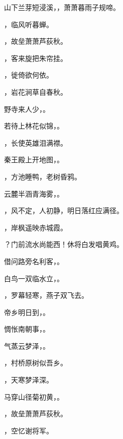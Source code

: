 \documentclass[12pt, a4paper, addpoints]{exam}
\begin{document}
\begin{questions}
\question[1] 山下兰芽短浸溪，\uline{\qquad\qquad\qquad}，萧萧暮雨子规啼。

\question[1] \uline{\qquad\qquad\qquad}，临风听暮蝉。

\question[1] \uline{\qquad\qquad\qquad}，故垒萧萧芦荻秋。

\question[1] \uline{\qquad\qquad\qquad}，客来旋把朱帘挂。

\question[1] \uline{\qquad\qquad\qquad}，徙倚欲何依。

\question[1] \uline{\qquad\qquad\qquad}，岩花涧草自春秋。

\question[1] 野寺来人少，\uline{\qquad\qquad\qquad}。

\question[1] 若待上林花似锦，\uline{\qquad\qquad\qquad}。

\question[1] \uline{\qquad\qquad\qquad}，长使英雄泪满襟。

\question[1] 秦王殿上开地图，\uline{\qquad\qquad\qquad}。

\question[1] \uline{\qquad\qquad\qquad}，方池睡鸭，老树昏鸦。

\question[1] 云麓半涵青海雾，\uline{\qquad\qquad\qquad}。

\question[1] \uline{\qquad\qquad\qquad}，风不定，人初静，明日落红应满径。

\question[1] \uline{\qquad\qquad\qquad}，岸枫遥映赤城霞。

\question[1] \uline{\qquad\qquad\qquad}？门前流水尚能西！休将白发唱黄鸡。

\question[1] 借问路旁名利客，\uline{\qquad\qquad\qquad}。

\question[1] 白鸟一双临水立，\uline{\qquad\qquad\qquad}。

\question[1] \uline{\qquad\qquad\qquad}，罗幕轻寒，燕子双飞去。

\question[1] 帝乡明日到，\uline{\qquad\qquad\qquad}。

\question[1] 惆怅南朝事，\uline{\qquad\qquad\qquad}。

\question[1] 气蒸云梦泽，\uline{\qquad\qquad\qquad}。

\question[1] \uline{\qquad\qquad\qquad}，村桥原树似吾乡。

\question[1] \uline{\qquad\qquad\qquad}，天寒梦泽深。

\question[1] 马穿山径菊初黄，\uline{\qquad\qquad\qquad}。

\question[1] \uline{\qquad\qquad\qquad}，故垒萧萧芦荻秋。

\question[1] \uline{\qquad\qquad\qquad}，空忆谢将军。


\end{questions}
\end{document}
